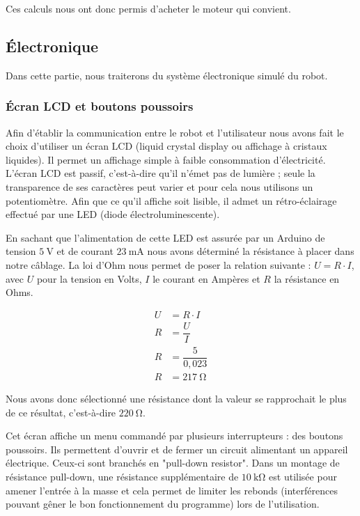 \documentclass[12pt,a4paper]{article}
\begin{document}
Ces calculs nous ont donc permis d'acheter le moteur qui convient.
	
	\subsection{Électronique}
	\indent\indent Dans cette partie, nous traiterons du système électronique simulé du robot.
	
	\subsubsection{Écran LCD et boutons poussoirs}
	
\indent\indent Afin d’établir la communication entre le robot et l’utilisateur nous avons fait le choix d’utiliser un écran LCD (liquid crystal display ou affichage à cristaux liquides). Il permet un affichage simple à faible consommation d’électricité. L’écran LCD est passif, c’est-à-dire qu’il n’émet pas de lumière ; seule la transparence de ses caractères peut varier et pour cela nous utilisons un potentiomètre. Afin que ce qu’il affiche soit lisible, il admet un rétro-éclairage effectué par une LED (diode électroluminescente). 

En sachant que l’alimentation de cette LED est assurée par un Arduino de tension $\SI{5}{\volt}$ et de courant $\SI{23}{\milli\ampere}$ nous avons déterminé la résistance à placer dans notre câblage. La loi d’Ohm nous permet de poser la relation suivante \nolinebreak: $U = R\cdot I$, avec $U$ pour la tension en Volts, $I$ le courant en Ampères et $R$ la résistance en Ohms.

	\begin{align*}
		U &= R\cdot I\\
		R &= \dfrac{U}{I}\\
		R &=  \dfrac{5}{0,023}\\
		R &= \SI{217}{\ohm}
	\end{align*}
	
	Nous avons donc sélectionné une résistance dont la valeur se rapprochait le plus de ce résultat, c’est-à-dire $\SI{220}{\ohm}$.

Cet écran affiche un menu commandé par plusieurs interrupteurs \nolinebreak : des boutons poussoirs. Ils permettent d’ouvrir et de fermer un circuit alimentant un appareil électrique. Ceux-ci sont branchés en "pull-down resistor".
Dans un montage de résistance pull-down, une résistance supplémentaire de $\SI{10}{\kilo\ohm}$ est utilisée pour amener l’entrée à la masse et cela permet de limiter les rebonds (interférences pouvant gêner le bon fonctionnement du programme) lors de l’utilisation.
\end{document}
